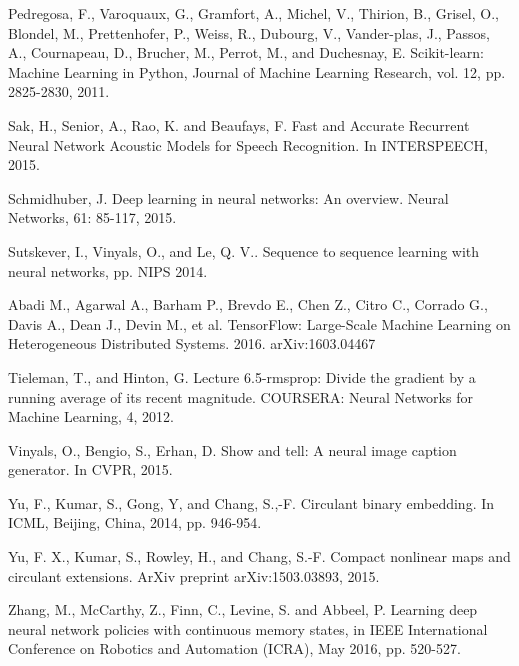 \documentclass[a4paper,11pt]{article}
\begin{document}
\begin{thebibliography}{1}
 Pedregosa, F., Varoquaux, G.,  Gramfort, A.,  Michel, V., Thirion, B., Grisel, O., Blondel, M., Prettenhofer, P.,  Weiss, R., Dubourg, V.,  Vander-plas, J., Passos, A., Cournapeau, D., Brucher, M., Perrot, M., and Duchesnay, E. Scikit-learn: Machine Learning in Python, Journal of Machine Learning Research, vol. 12, pp. 2825-2830, 2011.


 Sak, H., Senior, A., Rao, K. and Beaufays, F. Fast and Accurate Recurrent Neural Network Acoustic Models for Speech Recognition. In INTERSPEECH, 2015.

  Schmidhuber, J. Deep  learning  in  neural  networks:  An  overview. Neural  Networks,  61: 85-117, 2015.



 Sutskever, I., Vinyals, O., and Le, Q. V.. Sequence to sequence learning with neural networks, pp. NIPS 2014.


  Abadi M., Agarwal A., Barham P., Brevdo E., Chen Z., Citro C., Corrado G., Davis A., Dean J., Devin M., et al. TensorFlow: Large-Scale Machine Learning on Heterogeneous Distributed Systems. 2016. arXiv:1603.04467



 Tieleman, T., and Hinton, G.   Lecture 6.5-rmsprop:  Divide the gradient by a running average of its recent magnitude. COURSERA: Neural Networks for Machine Learning, 4, 2012.


 Vinyals, O., Bengio, S., Erhan, D. Show and tell: A neural image caption generator. In CVPR, 2015.




 Yu, F.,  Kumar, S., Gong, Y, and Chang, S.,-F.  Circulant binary embedding. In ICML, Beijing, China, 2014, pp. 946-954.

  Yu, F.  X.,  Kumar, S.,   Rowley, H.,  and  Chang, S.-F. Compact nonlinear maps and circulant extensions. ArXiv preprint arXiv:1503.03893, 2015.



 Zhang, M., McCarthy, Z., Finn, C., Levine, S. and Abbeel, P. Learning deep neural network policies with continuous memory states, in IEEE International Conference on Robotics and Automation (ICRA), May 2016, pp. 520-527.




\end{thebibliography}
\end{document}
